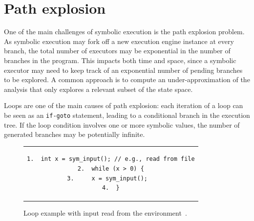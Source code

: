 
\section{Path explosion}
\label{se:path-explosion}

One of the main challenges of symbolic execution is the path explosion problem. As symbolic execution may fork off a new execution engine instance at every branch, the total number of executors may be exponential in the number of branches in the program. This impacts both time and space, since a symbolic executor may need to keep track of an exponential number of pending branches to be explored. A common approach is to compute an under-approximation of the analysis that only explores a relevant subset of the state space.

Loops are one of the main causes of path explosion: each iteration of a loop can be seen as an {\tt if-goto} statement, leading to a conditional branch in the execution tree. If the loop condition involves one or more symbolic values, the number of generated branches may be potentially infinite. 

\begin{figure}[t]
\begin{center}
\begin{tabular}{c}
\begin{lstlisting}[basicstyle=\ttfamily\scriptsize]
1.  int x = sym_input(); // e.g., read from file
2.  while (x > 0) {
3.     x = sym_input();  
4.  }
\end{lstlisting}
\end{tabular}
\end{center}
\vspace{-2mm}
\caption{Loop example with input read from the environment~\protect\cite{CS-CACM13}.}
\label{fi:example-loop}
\end{figure}

\vspace{-2pt} %



